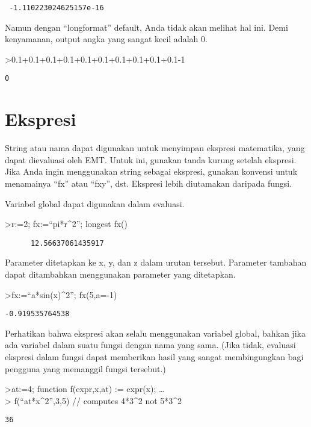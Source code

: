 \documentclass[
]{book}
\begin{document}
\begin{verbatim}
 -1.110223024625157e-16 
\end{verbatim}

Namun dengan ``longformat'' default, Anda tidak akan melihat hal ini. Demi kenyamanan, output angka yang sangat kecil adalah 0.

\textgreater0.1+0.1+0.1+0.1+0.1+0.1+0.1+0.1+0.1+0.1-1

\begin{verbatim}
0
\end{verbatim}

\chapter{Ekspresi}\label{ekspresi}

String atau nama dapat digunakan untuk menyimpan ekspresi matematika, yang dapat dievaluasi oleh EMT. Untuk ini, gunakan tanda kurung setelah ekspresi. Jika Anda ingin menggunakan string sebagai ekspresi, gunakan konvensi untuk menamainya ``fx'' atau ``fxy'', dst. Ekspresi lebih diutamakan daripada fungsi.

Variabel global dapat digunakan dalam evaluasi.

\textgreater r:=2; fx:=``pi*r\^{}2''; longest fx()

\begin{verbatim}
      12.56637061435917 
\end{verbatim}

Parameter ditetapkan ke x, y, dan z dalam urutan tersebut. Parameter tambahan dapat ditambahkan menggunakan parameter yang ditetapkan.

\textgreater fx:=``a*sin(x)\^{}2''; fx(5,a=-1)

\begin{verbatim}
-0.919535764538
\end{verbatim}

Perhatikan bahwa ekspresi akan selalu menggunakan variabel global, bahkan jika ada variabel dalam suatu fungsi dengan nama yang sama. (Jika tidak, evaluasi ekspresi dalam fungsi dapat memberikan hasil yang sangat membingungkan bagi pengguna yang memanggil fungsi tersebut.)

\textgreater at:=4; function f(expr,x,at) := expr(x); \ldots{}\\
\textgreater{} f(``at*x\^{}2'',3,5) // computes 4*3\^{}2 not 5*3\^{}2

\begin{verbatim}
36
\end{verbatim}
\end{document}
